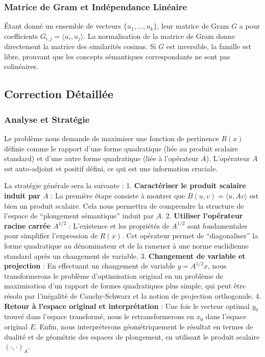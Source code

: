 \documentclass[11pt,a4paper]{report}
\begin{document}
\hypertarget{matrice-de-gram-et-induxe9pendance-linuxe9aire}{%
\subsubsection{Matrice de Gram et Indépendance
Linéaire}\label{matrice-de-gram-et-induxe9pendance-linuxe9aire}}

Étant donné un ensemble de vecteurs \(\{u_1, \dots, u_k\}\), leur
matrice de Gram \(G\) a pour coefficients
\(G_{i,j} = \langle u_i, u_j \rangle\). La normalisation de la matrice
de Gram donne directement la matrice des similarités cosinus. Si \(G\)
est inversible, la famille est libre, prouvant que les concepts
sémantiques correspondants ne sont pas colinéaires.

\hypertarget{correction-duxe9tailluxe9e}{%
\subsection{Correction Détaillée}\label{correction-duxe9tailluxe9e}}

\hypertarget{analyse-et-stratuxe9gie}{%
\subsubsection{Analyse et Stratégie}\label{analyse-et-stratuxe9gie}}

Le problème nous demande de maximiser une fonction de pertinence
\(R(x)\) définie comme le rapport d'une forme quadratique (liée au
produit scalaire standard) et d'une autre forme quadratique (liée à
l'opérateur \(A\)). L'opérateur \(A\) est auto-adjoint et positif
défini, ce qui est une information cruciale.

La stratégie générale sera la suivante : 1. \textbf{Caractériser le
produit scalaire induit par \(A\)} : La première étape consiste à
montrer que \(B(u,v) = \langle u, Av \rangle\) est bien un produit
scalaire. Cela nous permettra de comprendre la structure de l'espace de
``plongement sémantique'' induit par \(A\). 2. \textbf{Utiliser
l'opérateur racine carrée \(A^{1/2}\)} : L'existence et les propriétés
de \(A^{1/2}\) sont fondamentales pour simplifier l'expression de
\(R(x)\). Cet opérateur permet de ``diagonaliser'' la forme quadratique
au dénominateur et de la ramener à une norme euclidienne standard après
un changement de variable. 3. \textbf{Changement de variable et
projection} : En effectuant un changement de variable \(y = A^{1/2}x\),
nous transformerons le problème d'optimisation original en un problème
de maximisation d'un rapport de formes quadratiques plus simple, qui
peut être résolu par l'inégalité de Cauchy-Schwarz et la notion de
projection orthogonale. 4. \textbf{Retour à l'espace original et
interprétation} : Une fois le vecteur optimal \(y_0\) trouvé dans
l'espace transformé, nous le retransformerons en \(x_0\) dans l'espace
original \(E\). Enfin, nous interpréterons géométriquement le résultat
en termes de dualité et de géométrie des espaces de plongement, en
utilisant le produit scalaire \((\cdot, \cdot)_A\).
\end{document}
